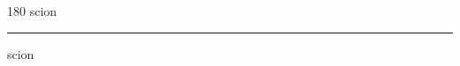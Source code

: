 
\begin{frame}
\begin{center}
\begin{turn}{180}
{\fontsize{2.5cm}{1em}\selectfont scion}
\end{turn}
\vspace{1em}\par  
\hrule
\vspace{1em}\par  
{\fontsize{2.5cm}{1em}\selectfont scion}
\end{center}
\end{frame}
